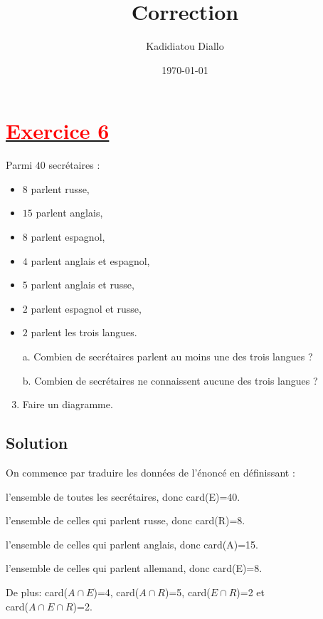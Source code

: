 \documentclass[12pt]{article}
\author{Kadidiatou Diallo}
\title{\textbf{Correction}}
\date{\today}
\begin{document}
\maketitle
\newpage

\section*{\underline{\textbf{\textcolor{red}{Exercice 6}}}} 

Parmi $40$ secrétaires : 

\begin{itemize}
    \item $8$ parlent russe,
    \item $15$ parlent anglais,
    \item $8$ parlent espagnol,
    \item $4$ parlent anglais et espagnol,
    \item $5$ parlent anglais et russe,
    \item $2$ parlent espagnol et russe,
    \item $2$ parlent les trois langues.
\end{itemize}

\begin{enumerate}
    \item[a.] Combien de secrétaires parlent au moins une des trois langues ?
    
    \item[b.] Combien de secrétaires ne connaissent aucune des trois langues ?
    
    \item Faire un diagramme.
\end{enumerate}

\subsection*{Solution}
On commence par traduire les données de l'énoncé en définissant :

l'ensemble  de toutes les secrétaires, donc  card(E)=40.

l'ensemble  de celles qui parlent russe, donc  card(R)=8.

l'ensemble  de celles qui parlent anglais, donc  card(A)=15.

l'ensemble  de celles qui parlent allemand, donc card(E)=8. 

De plus: card($A\cap E$)=4, card($A\cap R$)=5, card($E\cap R$)=2 et\\ card($A\cap E\cap R$)=2.
\end{document}
